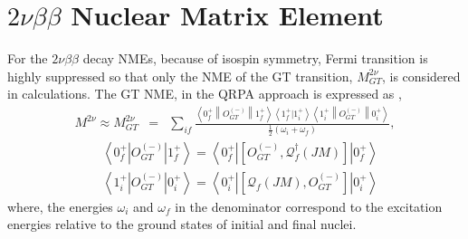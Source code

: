 \documentclass[master]{shnuthesis}
\begin{document}
\chapter{$2\nu\beta\beta$ Nuclear Matrix Element}
For the $2\nu\beta\beta$ decay NMEs, because of isospin symmetry, Fermi transition is highly suppressed so that only the NME of the GT transition, $M_{GT}^{2\nu}$, is considered in calculations. The GT NME, in the QRPA approach is expressed as \cite{PhysRevC.105.044331,Wu_2025},
\begin{eqnarray}
    M^{2\nu} \approx M_{GT}^{2\nu} &=& \sum_{if} \frac{\left\langle 0_f^+ \left\| O_{GT}^{\left(-\right)} \right\|1_f^+\right\rangle \left\langle 1_f^+|1_i^+ \right\rangle \left\langle 1_i^+ \left\| O_{GT}^{\left(-\right)} \right\|0_i^+\right\rangle}{\frac{1}{2}\left(\omega_i+\omega_f\right)}, \label{2vbetabeta}
\end{eqnarray}
\begin{align}
    & \left\langle 0_f^+ \left| O_{GT}^{\left(-\right)} \right|1_f^+\right\rangle = \left\langle 0_f^+ \left| \left[O_{GT}^{\left(-\right)}, \mathcal{Q}_f^\dagger(JM)\right] \right|0_f^+\right\rangle \\
    & \left\langle 1_i^+ \left| O_{GT}^{\left(-\right)} \right|0_i^+\right\rangle = \left\langle 0_i^+ \left| \left[\mathcal{Q}_f(JM), O_{GT}^{\left(-\right)}\right] \right|0_i^+\right\rangle
\end{align}
where, the energies $\omega_i$ and $\omega_f$ in the denominator correspond to the excitation energies relative to the ground states of initial and final nuclei.
\end{document}
